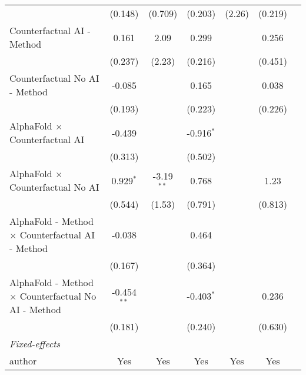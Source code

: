 \begin{tabular}{lcccccc}
                                                              & (0.148)       & (0.709)      & (0.203)      & (2.26)  & (0.219)      &   \\   
   Counterfactual AI - Method                                 & 0.161         & 2.09         & 0.299        &         & 0.256        &   \\   
                                                              & (0.237)       & (2.23)       & (0.216)      &         & (0.451)      &   \\   
   Counterfactual No AI - Method                              & -0.085        &              & 0.165        &         & 0.038        &   \\   
                                                              & (0.193)       &              & (0.223)      &         & (0.226)      &   \\   
   AlphaFold $\times$ Counterfactual AI                       & -0.439        &              & -0.916$^{*}$ &         &              &   \\   
                                                              & (0.313)       &              & (0.502)      &         &              &   \\   
   AlphaFold $\times$ Counterfactual No AI                    & 0.929$^{*}$   & -3.19$^{**}$ & 0.768        &         & 1.23         &   \\   
                                                              & (0.544)       & (1.53)       & (0.791)      &         & (0.813)      &   \\   
   AlphaFold - Method $\times$ Counterfactual AI - Method     & -0.038        &              & 0.464        &         &              &   \\   
                                                              & (0.167)       &              & (0.364)      &         &              &   \\   
   AlphaFold - Method $\times$ Counterfactual No AI - Method  & -0.454$^{**}$ &              & -0.403$^{*}$ &         & 0.236        &   \\   
                                                              & (0.181)       &              & (0.240)      &         & (0.630)      &   \\   
   \midrule
   \emph{Fixed-effects}\\
   author                                                     & Yes           & Yes          & Yes          & Yes     & Yes          & \\  

\end{tabular}
